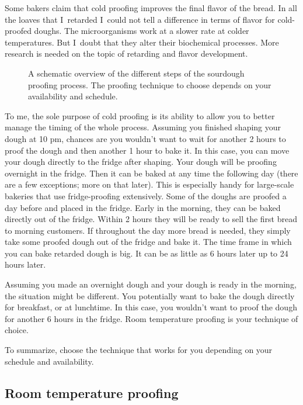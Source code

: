 Some bakers claim that cold proofing improves the final flavor of the bread.
In all the loaves that I~retarded I~could not tell a difference
in terms of flavor for cold-proofed doughs. The microorganisms work
at a slower rate at colder temperatures. But I~doubt that they alter
their biochemical processes. More research is needed on the topic
of retarding and flavor development.

\begin{figure}[!htb]
\begin{center}
  
  \caption{A schematic overview of the different steps of the sourdough proofing process. The proofing technique to choose
  depends on your availability and schedule.}%
  \label{fig:proofing-process}
\end{center}
\end{figure}

To me, the sole purpose of cold proofing is its ability to allow you
to better manage the timing of the whole process. Assuming you finished shaping
your dough at 10 pm, chances are you wouldn't want to wait for another
2 hours to proof the dough and then another 1 hour to bake it. In this case,
you can move your dough directly to the fridge after shaping. Your
dough will be proofing overnight in the fridge. Then it can be baked at any time
the following day (there are a few exceptions; more on that later).
This is especially handy for large-scale bakeries that use fridge-proofing
extensively. Some of the doughs are proofed a day before and placed in the fridge.
Early in the morning, they can be baked directly out of the fridge. Within 2
hours they will be ready to sell the first bread to morning customers. If
throughout the day more bread is needed, they simply take some proofed dough out
of the fridge and bake it. The time frame in which you can bake retarded
dough is big. It can be as little as 6 hours later up to 24 hours later.

Assuming you made an overnight dough and your dough is ready in the morning,
the situation might be different. You potentially want to bake the dough directly
for breakfast, or at lunchtime. In this case, you wouldn't want to proof the dough for
another 6 hours in the fridge. Room temperature proofing is your technique
of choice.

To summarize, choose the technique that works for you depending on your
schedule and availability.

\subsection{Room temperature proofing}

